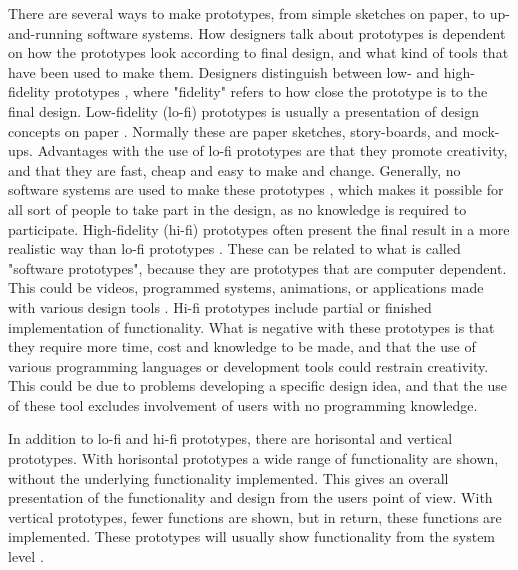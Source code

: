 There are several ways to make prototypes, from simple sketches on paper, to up-and-running software systems. How designers talk about prototypes is dependent on how the prototypes look according to final design, and what kind of tools that have been used to make them.  Designers distinguish between low- and high-fidelity prototypes \cite{mackayprototyping} \cite{houde1997prototypes} \cite{mmi}, where "fidelity" refers to how close the prototype is to the final design. Low-fidelity (lo-fi) prototypes is usually a presentation of design concepts on paper \cite{mmi} \cite{lofihifi}. Normally these are paper sketches, story-boards, and mock-ups. Advantages with the use of lo-fi prototypes are that they promote creativity, and that they are fast, cheap and easy to make and change. Generally, no software systems are used to make these prototypes \cite{lofihifi}, which makes it possible for all sort of people to take part in the design, as no knowledge is required to participate. High-fidelity (hi-fi) prototypes often present the final result in a more realistic way than lo-fi prototypes \cite{mmi}. These can be related to what is called "software prototypes", because they are prototypes that are computer dependent. This could be videos, programmed systems, animations, or applications made with various design tools \cite{mackayprototyping}. Hi-fi prototypes include partial or finished implementation of functionality. What is negative with these prototypes is that they require more time, cost and knowledge to be made, and that the use of various programming languages or development tools could restrain creativity. This could be due to problems developing a specific design idea, and that the use of these tool excludes involvement of users with no programming knowledge.    

In addition to lo-fi and hi-fi prototypes, there are horisontal and vertical prototypes. With horisontal prototypes a wide range of functionality are shown, without the underlying functionality implemented. This gives an overall presentation of the functionality and design from the users point of view. With vertical prototypes, fewer functions are shown, but in return, these functions are implemented. These prototypes will usually show functionality from the system level \cite{mackayprototyping} \cite{horver}.

